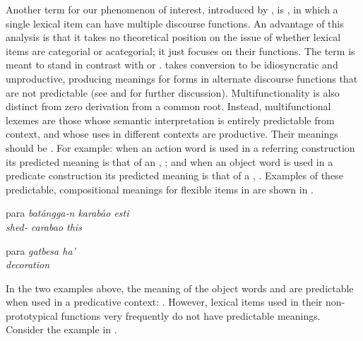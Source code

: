 Another term for our phenomenon of interest, introduced by \parencite{Lier2012}, is , in which a single lexical item can have multiple discourse functions. An advantage of this analysis is that it takes no theoretical position on the issue of whether lexical items are categorial or acategorial; it just focuses on their functions. The term  is meant to stand in contrast with  or .  takes conversion to be idiosyncratic and unproductive, producing meanings for forms in alternate discourse functions that are not predictable (see  and  for further discussion). Multifunctionality is also distinct from zero derivation from a common root. Instead, multifunctional lexemes are those whose semantic interpretation is entirely predictable from context, and whose uses in different contexts are productive. Their meanings should be . For example: when an action word is used in a referring construction its predicted meaning is that of an , ; and when an object word is used in a predicate construction its predicted meaning is that of a , . Examples of these predictable, compositional meanings for flexible items in  are shown in .

\begin{exe}

  \ex\label{ex:2.5}
  \begin{xlist}

    \ex\label{ex:2.5a}
    \gll para     \em{batångga‑n}     karabåo esti\\
          \em{shed‑} carabao this\\

    \ex\label{ex:2.5b}
    \gll para     \em{gatbesa}    ha'\\
          \em{decoration} \\

  \end{xlist}

\end{exe}

\noindent In the two examples above, the meaning of the object words  and  are predictable when used in a predicative context: . However, lexical items used in their non-prototypical functions very frequently do not have predictable meanings. Consider the example in .

